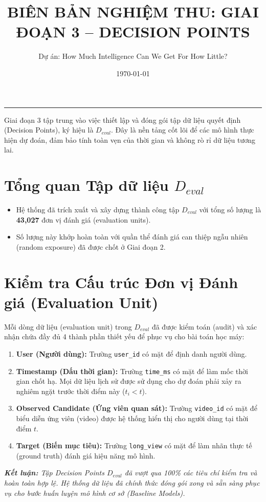 \documentclass[12pt,a4paper]{article}
\title{\textbf{BIÊN BẢN NGHIỆM THU: GIAI ĐOẠN 3 -- DECISION POINTS}}
\author{Dự án: How Much Intelligence Can We Get For How Little?}
\date{\today}
\begin{document}
\maketitle
\hrule
\vspace{15pt}

\noindent Giai đoạn 3 tập trung vào việc thiết lập và đóng gói tập dữ liệu quyết định (Decision Points), ký hiệu là $D_{eval}$. Đây là nền tảng cốt lõi để các mô hình thực hiện dự đoán, đảm bảo tính toàn vẹn của thời gian và không rò rỉ dữ liệu tương lai.

\section{Tổng quan Tập dữ liệu $D_{eval}$}
\begin{itemize}
    \item Hệ thống đã trích xuất và xây dựng thành công tập $D_{eval}$ với tổng số lượng là \textbf{43,027} đơn vị đánh giá (evaluation units).
    \item Số lượng này khớp hoàn toàn với quần thể đánh giá can thiệp ngẫu nhiên (random exposure) đã được chốt ở Giai đoạn 2.
\end{itemize}

\section{Kiểm tra Cấu trúc Đơn vị Đánh giá (Evaluation Unit)}
Mỗi dòng dữ liệu (evaluation unit) trong $D_{eval}$ đã được kiểm toán (audit) và xác nhận chứa đầy đủ 4 thành phần thiết yếu để phục vụ cho bài toán học máy:

\begin{enumerate}
    \item \textbf{User (Người dùng):} Trường \texttt{user\_id} có mặt để định danh người dùng.
    \item \textbf{Timestamp (Dấu thời gian):} Trường \texttt{time\_ms} có mặt để làm mốc thời gian chốt hạ. Mọi dữ liệu lịch sử được sử dụng cho dự đoán phải xảy ra nghiêm ngặt trước thời điểm này ($t_i < t$).
    \item \textbf{Observed Candidate (Ứng viên quan sát):} Trường \texttt{video\_id} có mặt để biểu diễn ứng viên (video) được hệ thống hiển thị cho người dùng tại thời điểm $t$.
    \item \textbf{Target (Biến mục tiêu):} Trường \texttt{long\_view} có mặt để làm nhãn thực tế (ground truth) đánh giá hiệu năng mô hình.
\end{enumerate}

\vspace{20pt}
\noindent\textit{\textbf{Kết luận:} Tập Decision Points $D_{eval}$ đã vượt qua 100\% các tiêu chí kiểm tra và hoàn toàn hợp lệ. Hệ thống dữ liệu đã chính thức đóng gói xong và sẵn sàng phục vụ cho bước huấn luyện mô hình cơ sở (Baseline Models).}
\end{document}
